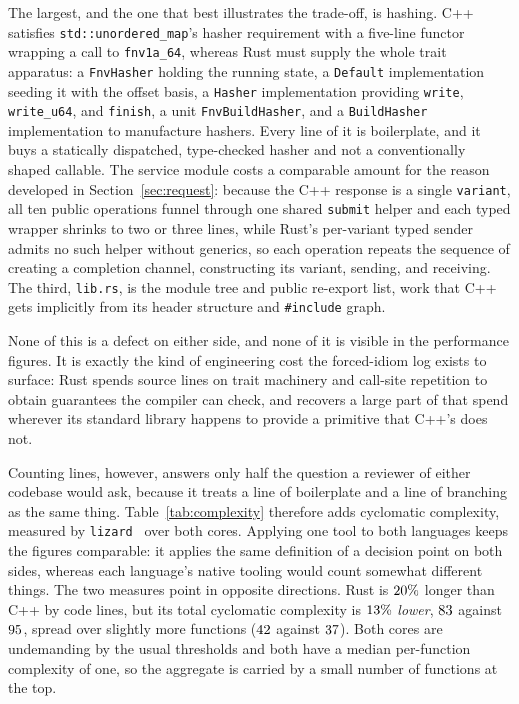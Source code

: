 \documentclass[english,twoside,openright,a4paper,censored,csm,software-track-2020]{HYthesisML}
\begin{document}
The largest, and the one that best illustrates the trade-off, is hashing. C++ satisfies
\texttt{std::unordered\_map}'s hasher requirement with a five-line functor wrapping a call to
\texttt{fnv1a\_64}, whereas Rust must supply the whole trait apparatus: a \texttt{FnvHasher}
holding the running state, a \texttt{Default} implementation seeding it with the offset basis,
a \texttt{Hasher} implementation providing \texttt{write}, \texttt{write\_u64}, and
\texttt{finish}, a unit \texttt{FnvBuildHasher}, and a \texttt{BuildHasher} implementation to
manufacture hashers. Every line of it is boilerplate, and it buys a statically dispatched,
type-checked hasher and not a conventionally shaped callable. The service module costs a
comparable amount for the reason developed in Section~\ref{sec:request}: because the C++
response is a single \texttt{variant}, all ten public operations funnel through one shared
\texttt{submit} helper and each typed wrapper shrinks to two or three lines, while Rust's
per-variant typed sender admits no such helper without generics, so each operation repeats the
sequence of creating a completion channel, constructing its variant, sending, and receiving.
The third, \texttt{lib.rs}, is the module tree and public re-export list, work that C++ gets
implicitly from its header structure and \texttt{\#include} graph.

None of this is a defect on either side, and none of it is visible in the performance figures.
It is exactly the kind of engineering cost the forced-idiom log exists to surface: Rust spends
source lines on trait machinery and call-site repetition to obtain guarantees the compiler can
check, and recovers a large part of that spend wherever its standard library happens to
provide a primitive that C++'s does not.

Counting lines, however, answers only half the question a reviewer of either codebase would
ask, because it treats a line of boilerplate and a line of branching as the same thing.
Table~\ref{tab:complexity} therefore adds cyclomatic complexity, measured by
\texttt{lizard}~\cite{lizard} over both cores. Applying one tool to both languages keeps the figures comparable: it applies the same definition of a decision point on both sides,
whereas each language's native tooling would count somewhat different things. The two measures
point in opposite directions. Rust is $20\%$ longer than C++ by code lines, but its
total cyclomatic complexity is $13\%$ \emph{lower}, $83$ against
$95$, spread over slightly more functions ($42$ against $37$). Both
cores are undemanding by the usual thresholds and both have a median per-function complexity
of one, so the aggregate is carried by a small number of functions at the top.
\end{document}
